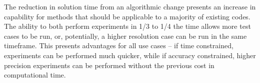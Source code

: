 The reduction in solution time from an algorithmic change presents an increase in capability for {\fmmbem} methods that should be applicable to a majority of existing codes. The ability to both perform experiments in 1/3 to 1/4 the time allows more test cases to be run, or, potentially, a higher resolution case can be run in the same timeframe. This presents advantages for all use cases -- if time constrained, experiments can be performed much quicker, while if accuracy constrained, higher precision experiments can be performed without the previous cost in computational time.